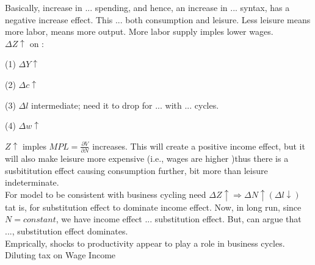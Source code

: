 Basically, increase in ... spending, and hence, an increase in ... syntax, has a negative increase effect. This ... both consumption and leisure. Less leisure means more labor, means more output. More labor supply imples lower wages.\\

$\Delta Z\uparrow $ on : \\
\begin{list}{}{}
\item (1) $\Delta Y \uparrow$
\item (2) $\Delta c \uparrow$
\item (3) $\Delta l $ intermediate; need it to drop for ... with ... cycles.
\item (4) $\Delta w \uparrow$
\end{list}

$Z \uparrow$ imples $MPL = \frac{\partial V}{\partial N}$ increases. This will create a positive income effect, but it will also make leisure more expensive (i.e., wages are higher )thus there is a susbititution effect causing consumption further, bit more than leisure indeterminate.\\

For model to be consistent with business cycling need $\Delta Z \uparrow \Rightarrow \Delta N \uparrow (\Delta l \downarrow)$  tat is, for substitution effect to dominate income effect.  Now, in long run, since $N = constant$, we have income effect ... substitution effect. But, can argue that ..., substitution effect dominates. \\

Emprically, shocks to productivity appear to play a role in business cycles.\\

Diluting tax on Wage Income\\
